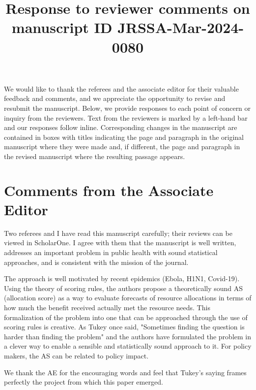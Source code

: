 \documentclass{article}
\author{}
\title{Response to reviewer comments on \\ manuscript ID JRSSA-Mar-2024-0080}
\begin{document}
\newcommand{\del}[2]{\frac{\partial {#1} }{\partial {#2}} }
\newcommand{\dby}[2]{\frac{d {#1} }{d {#2}} }
\newcommand{\sbar}{\overline{s}}
\newtheorem{proposition}{Proposition}

\theoremstyle{remark}
\newtheorem*{remark}{Remark}

\maketitle

We would like to thank the referees and the associate editor for their valuable feedback and comments, and we appreciate the opportunity 
to revise and resubmit the manuscript.  Below, we provide responses to each point of concern or inquiry from the reviewers.
Text from the reviewers is marked by a left-hand bar and our responses follow inline.  Corresponding changes in the manuscript are contained
in boxes with titles indicating the page and paragraph in the original manuscript where they were made and, if different, the page 
and paragraph in the revised manuscript where the resulting passage appears.

\section*{Comments from the Associate Editor}

\begin{quotebar}
Two referees and I have read this manuscript carefully; their reviews
can be viewed in ScholarOne.  I agree with them that the manuscript is
well written, addresses an important problem in public health with sound
statistical approaches, and is consistent with the mission of the journal.

The approach is well motivated by recent epidemics (Ebola, H1N1, Covid-19).
Using the theory of scoring rules, the authors propose a theoretically
sound AS (allocation score) as a way to evaluate forecasts of resource
allocations in terms of how much the benefit received actually met the
resource needs.  This formalization of the problem into one that can be
approached through the use of scoring rules is creative. As Tukey once
said, "Sometimes finding the question is harder than finding the problem"
and the authors have formulated the problem in a clever way to enable a
sensible and statistically sound approach to it. For policy makers,
the AS can be related to policy impact.
\end{quotebar}

We thank the AE for the encouraging words and feel that Tukey's saying frames perfectly
the project from which this paper emerged.
\end{document}
